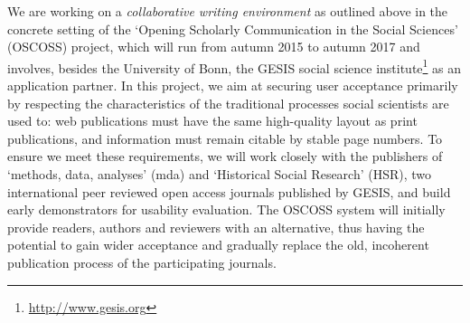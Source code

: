 \documentclass[a4paper,USenglish]{dagrep}
\begin{document}
We are working on a \emph{collaborative writing environment} as outlined above
in the concrete setting of the `Opening Scholarly Communication in the Social
Sciences' (OSCOSS) project, which will run from autumn 2015 to autumn 2017 and
involves, besides the University of Bonn, the GESIS social science
institute\footnote{\url{http://www.gesis.org}} as an application partner.
In this project, we aim at securing user acceptance primarily by respecting the
characteristics of the traditional processes social scientists are used to: web
publications must have the same high-quality layout as print publications, and
information must remain citable by stable page numbers.
To ensure we meet these requirements, we will work closely with the publishers
of `methods, data, analyses' (mda) and `Historical Social Research' (HSR), two
international peer reviewed open access journals published by GESIS, and build
early demonstrators for usability evaluation.
The OSCOSS system will initially provide readers, authors and reviewers with an
alternative, thus having the potential to gain wider acceptance and gradually
replace the old, incoherent publication process of the participating journals.
\end{document}
